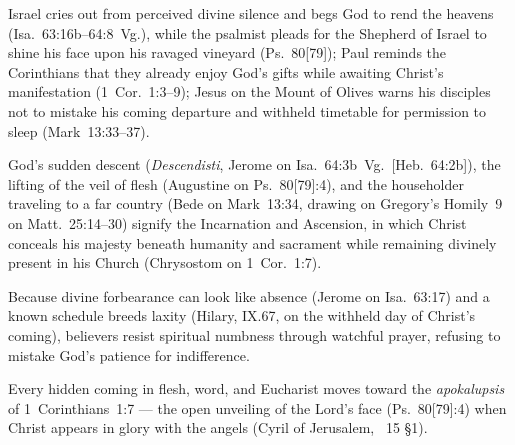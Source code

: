 \begin{fourSenses}
\item[Literal.] Israel cries out from perceived divine silence and begs God to rend the heavens (Isa.~63:16b--64:8~Vg.), while the psalmist pleads for the Shepherd of Israel to shine his face upon his ravaged vineyard (Ps.~80[79]); Paul reminds the Corinthians that they already enjoy God's gifts while awaiting Christ's manifestation (1~Cor.~1:3--9); Jesus on the Mount of Olives warns his disciples not to mistake his coming departure and withheld timetable for permission to sleep (Mark~13:33--37).
\item[Allegorical.] God's sudden descent (\emph{Descendisti}, Jerome on Isa.~64:3b~Vg.\ [Heb.~64:2b]), the lifting of the veil of flesh (Augustine on Ps.~80[79]:4), and the householder traveling to a far country (Bede on Mark~13:34, drawing on Gregory's Homily~9 on Matt.~25:14--30) signify the Incarnation and Ascension, in which Christ conceals his majesty beneath humanity and sacrament while remaining divinely present in his Church (Chrysostom on 1~Cor.~1:7).
\item[Moral.] Because divine forbearance can look like absence (Jerome on Isa.~63:17) and a known schedule breeds laxity (Hilary,  IX.67, on the withheld day of Christ's coming), believers resist spiritual numbness through watchful prayer, refusing to mistake God's patience for indifference.
\item[Anagogical.] Every hidden coming in flesh, word, and Eucharist moves toward the \emph{apokalupsis} of 1~Corinthians~1:7 --- the open unveiling of the Lord's face (Ps.~80[79]:4) when Christ appears in glory with the angels (Cyril of Jerusalem, ~15 §1).
\end{fourSenses}
